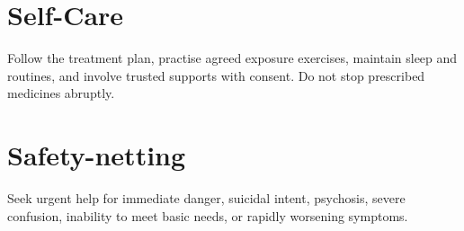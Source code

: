 \section*{Self-Care}
Follow the treatment plan, practise agreed exposure exercises, maintain sleep and routines, and involve trusted supports with consent. Do not stop prescribed medicines abruptly.
\section*{Safety-netting}
Seek urgent help for immediate danger, suicidal intent, psychosis, severe confusion, inability to meet basic needs, or rapidly worsening symptoms.
